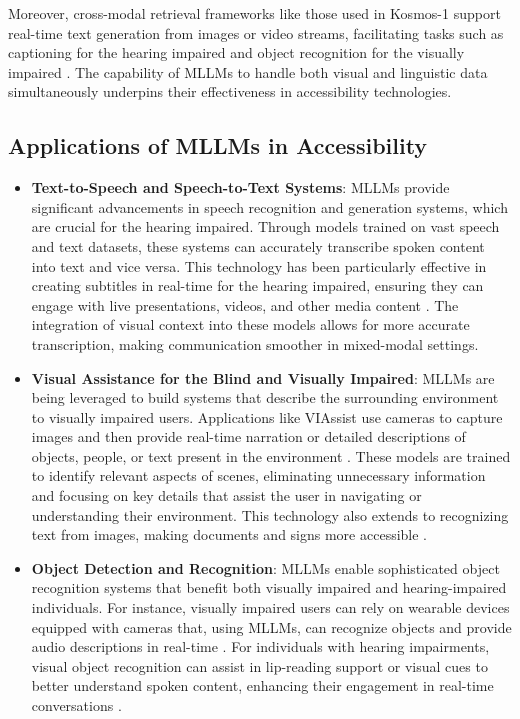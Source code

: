 Moreover, cross-modal retrieval frameworks like those used in Kosmos-1 support real-time text generation from images or video streams, facilitating tasks such as captioning for the hearing impaired and object recognition for the visually impaired \cite{vs2024gomez}. The capability of MLLMs to handle both visual and linguistic data simultaneously underpins their effectiveness in accessibility technologies.

\subsection{Applications of MLLMs in Accessibility}

\begin{itemize}
    \item \textbf{Text-to-Speech and Speech-to-Text Systems}: MLLMs provide significant advancements in speech recognition and generation systems, which are crucial for the hearing impaired. Through models trained on vast speech and text datasets, these systems can accurately transcribe spoken content into text and vice versa. This technology has been particularly effective in creating subtitles in real-time for the hearing impaired, ensuring they can engage with live presentations, videos, and other media content \cite{vs2023chen,vs2024rao}. The integration of visual context into these models allows for more accurate transcription, making communication smoother in mixed-modal settings.

    \item \textbf{Visual Assistance for the Blind and Visually Impaired}: MLLMs are being leveraged to build systems that describe the surrounding environment to visually impaired users. Applications like VIAssist use cameras to capture images and then provide real-time narration or detailed descriptions of objects, people, or text present in the environment \cite{yang2024viassist}. These models are trained to identify relevant aspects of scenes, eliminating unnecessary information and focusing on key details that assist the user in navigating or understanding their environment. This technology also extends to recognizing text from images, making documents and signs more accessible \cite{vs2024song}.

    \item \textbf{Object Detection and Recognition}: MLLMs enable sophisticated object recognition systems that benefit both visually impaired and hearing-impaired individuals. For instance, visually impaired users can rely on wearable devices equipped with cameras that, using MLLMs, can recognize objects and provide audio descriptions in real-time \cite{vs2024li}. For individuals with hearing impairments, visual object recognition can assist in lip-reading support or visual cues to better understand spoken content, enhancing their engagement in real-time conversations \cite{vs2020parde}.


\end{itemize}
